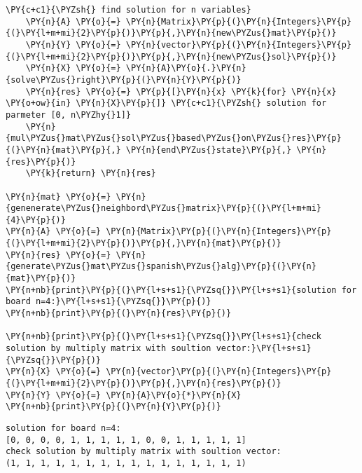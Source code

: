 \begin{english}
\begin{tcolorbox}[breakable, size=fbox, boxrule=1pt, pad at break*=1mm,colback=cellbackground, colframe=cellborder]
\begin{Verbatim}[commandchars=\\\{\}]
    \PY{c+c1}{\PYZsh{} find solution for n variables}
    \PY{n}{A} \PY{o}{=} \PY{n}{Matrix}\PY{p}{(}\PY{n}{Integers}\PY{p}{(}\PY{l+m+mi}{2}\PY{p}{)}\PY{p}{,}\PY{n}{new\PYZus{}mat}\PY{p}{)}
    \PY{n}{Y} \PY{o}{=} \PY{n}{vector}\PY{p}{(}\PY{n}{Integers}\PY{p}{(}\PY{l+m+mi}{2}\PY{p}{)}\PY{p}{,}\PY{n}{new\PYZus{}sol}\PY{p}{)}
    \PY{n}{X} \PY{o}{=} \PY{n}{A}\PY{o}{.}\PY{n}{solve\PYZus{}right}\PY{p}{(}\PY{n}{Y}\PY{p}{)}
    \PY{n}{res} \PY{o}{=} \PY{p}{[}\PY{n}{x} \PY{k}{for} \PY{n}{x} \PY{o+ow}{in} \PY{n}{X}\PY{p}{]} \PY{c+c1}{\PYZsh{} solution for parmeter [0, n\PYZhy{}1]}
    \PY{n}{mul\PYZus{}mat\PYZus{}sol\PYZus{}based\PYZus{}on\PYZus{}res}\PY{p}{(}\PY{n}{mat}\PY{p}{,} \PY{n}{end\PYZus{}state}\PY{p}{,} \PY{n}{res}\PY{p}{)}
    \PY{k}{return} \PY{n}{res}

\PY{n}{mat} \PY{o}{=} \PY{n}{genenerate\PYZus{}neighbord\PYZus{}matrix}\PY{p}{(}\PY{l+m+mi}{4}\PY{p}{)}
\PY{n}{A} \PY{o}{=} \PY{n}{Matrix}\PY{p}{(}\PY{n}{Integers}\PY{p}{(}\PY{l+m+mi}{2}\PY{p}{)}\PY{p}{,}\PY{n}{mat}\PY{p}{)}
\PY{n}{res} \PY{o}{=} \PY{n}{generate\PYZus{}mat\PYZus{}spanish\PYZus{}alg}\PY{p}{(}\PY{n}{mat}\PY{p}{)}
\PY{n+nb}{print}\PY{p}{(}\PY{l+s+s1}{\PYZsq{}}\PY{l+s+s1}{solution for board n=4:}\PY{l+s+s1}{\PYZsq{}}\PY{p}{)}
\PY{n+nb}{print}\PY{p}{(}\PY{n}{res}\PY{p}{)}

\PY{n+nb}{print}\PY{p}{(}\PY{l+s+s1}{\PYZsq{}}\PY{l+s+s1}{check solution by multiply matrix with soultion vector:}\PY{l+s+s1}{\PYZsq{}}\PY{p}{)}
\PY{n}{X} \PY{o}{=} \PY{n}{vector}\PY{p}{(}\PY{n}{Integers}\PY{p}{(}\PY{l+m+mi}{2}\PY{p}{)}\PY{p}{,}\PY{n}{res}\PY{p}{)}
\PY{n}{Y} \PY{o}{=} \PY{n}{A}\PY{o}{*}\PY{n}{X}
\PY{n+nb}{print}\PY{p}{(}\PY{n}{Y}\PY{p}{)}
\end{Verbatim}
\end{tcolorbox}

    \begin{Verbatim}[commandchars=\\\{\}]
solution for board n=4:
[0, 0, 0, 0, 1, 1, 1, 1, 1, 0, 0, 1, 1, 1, 1, 1]
check solution by multiply matrix with soultion vector:
(1, 1, 1, 1, 1, 1, 1, 1, 1, 1, 1, 1, 1, 1, 1, 1)
    \end{Verbatim}
\end{english}

